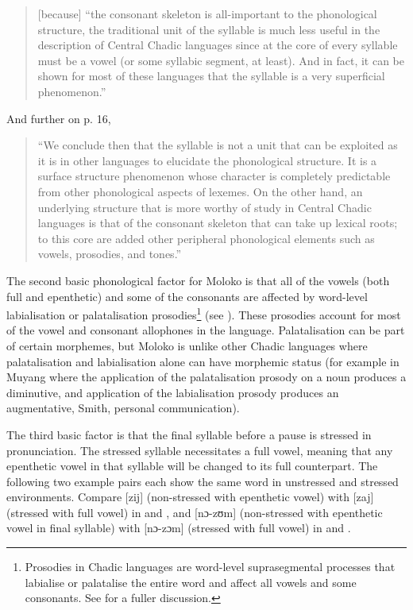 \begin{quote}
[because] “the consonant skeleton is all-important to the phonological structure, the traditional unit of the syllable is much less useful in the description of Central Chadic languages since at the core of every syllable must be a vowel (or some syllabic segment, at least). And in fact, it can be shown for most of these languages that the syllable is a very superficial phenomenon.”
\end{quote}

And further on p. 16, 

\begin{quote}
“We conclude then that the syllable is not a unit that can be exploited as it is in other languages to elucidate the phonological  structure. It is a surface structure phenomenon whose character is completely predictable from other phonological aspects of lexemes. On the other hand, an underlying structure that is more worthy of study in Central Chadic languages is that of the consonant skeleton that can take up lexical roots; to this core are added other peripheral phonological elements such as vowels, prosodies, and tones.”
\end{quote}

The second basic phonological factor for Moloko is that all of the vowels (both full and epenthetic) and some of the consonants are affected by word-level labialisation or palatalisation prosodies\footnote{Prosodies in Chadic languages are word-level suprasegmental processes that labialise or palatalise the entire word and affect all vowels and some consonants. See \citet{Roberts2001} for a fuller discussion.} (see ). These prosodies account for most of the vowel and consonant allophones in the language. Palatalisation can be part of certain morphemes, but Moloko is unlike other Chadic languages where palatalisation and labialisation alone can have morphemic status (for example in Muyang where the application of the palatalisation prosody on a noun produces a diminutive, and application of the labialisation prosody produces an augmentative, Smith, personal communication).

The third basic factor is that the final syllable before a pause is stressed in pronunciation. The stressed syllable necessitates a full vowel, meaning that any epenthetic vowel in that syllable will be changed to its full counterpart.  The following two example pairs each show the same word in unstressed and stressed environments. Compare [zij] (non-stressed with epenthetic vowel) with [zaj] (stressed with full vowel) in  and , and [nɔ-zʊm] (non-stressed with epenthetic vowel in final syllable) with [nɔ-zɔm] (stressed with full vowel) in  and . 


